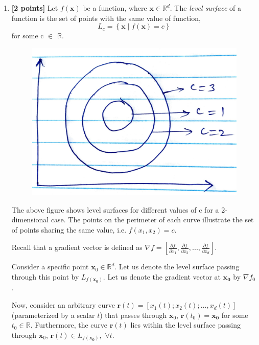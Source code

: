 \documentclass[11pt,english]{article}
\begin{document}
\begin{enumerate}[start]

\item
\textbf{[2 points]}
Let $f(\mathbf{x})$ be a function, where $\mathbf{x} \in \mathbb{R}^d$.
The \textit{level surface} of a function is the set of points with the same value of function, \ie
\begin{equation}
    L_c = \left\{ \mathbf{x} \mid f(\mathbf{x}) = c \right\} \label{q11.ls}
\end{equation}
for some c $\in$ $\mathbb{R}$. 

\begin{figure}[h!]
    \centering
    \includegraphics[scale=0.5]{circle_dl.pdf}
\end{figure}

The above figure shows level surfaces for different values of c for a 2-dimensional case. The points on the perimeter of each curve illustrate the set of points sharing the same value, i.e. $f(x_1, x_2) = c$.

Recall that a gradient vector is defined as $\nabla f = \left[ \frac{\partial f}{\partial x_1}, \frac{\partial f}{\partial x_2}, ..., \frac{\partial f}{\partial x_d} \right]$.

Consider a specific point $\mathbf{x}_0 \in \mathbb{R}^d$. Let us denote the level surface passing through this point by $L_{f(\mathbf{x_0})}$. Let us denote the gradient vector at $\mathbf{x_0}$ by $\nabla f_0$. 

Now, consider an arbitrary curve $\mathbf{r}(t) = \left[x_1(t); x_2(t); \ldots, x_d(t)\right]$ (parameterized by a scalar $t$) that passes through $\mathbf{x}_0$, 
\ie $\mathbf{r}(t_0) = \mathbf{x_0}$ for some $t_0 \in \mathbb{R}$. Furthermore, 
the curve $\mathbf{r}(t)$ lies within the level surface passing through $\mathbf{x}_0$, \ie $\mathbf{r}(t) \in L_{f(\mathbf{x_0})}, \,\, \forall t$.  


\end{enumerate}
\end{document}
